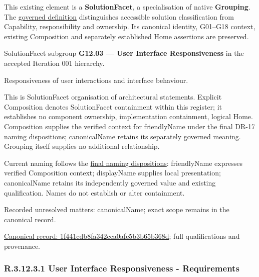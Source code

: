 This existing element is a \textbf{SolutionFacet}, a specialisation of native
\textbf{Grouping}. The \href{\detokenize{../../../../../../../governance/continuum-representation.md#solutionfacet-classification--1119-candidate}}{governed definition}
distinguishes accessible solution classification from Capability, responsibility
and ownership. Its canonical identity, G01–G18 context, existing Composition
and separately established Home assertions are preserved.



SolutionFacet subgroup \textbf{G12.03 — User Interface Responsiveness} in the accepted Iteration 001 hierarchy.



Responsiveness of user interactions and interface behaviour.



This is SolutionFacet organisation of architectural statements. Explicit Composition denotes SolutionFacet containment within this register; it establishes no component ownership, implementation containment, logical Home. Composition supplies the verified context for friendlyName under the final DR-17 naming dispositions; canonicalName retains its separately governed meaning. Grouping itself supplies no additional relationship.



Current naming follows the \href{\detokenize{../../../../../../../governance/canonical-identity-and-naming.md#solutionfacet-naming-roles--dr-17-final-dispositions}}{final naming dispositions}: friendlyName expresses verified Composition context; displayName supplies local presentation; canonicalName retains its independently governed value and existing qualification. Names do not establish or alter containment.


{\small Recorded unresolved matters: canonicalName; exact scope remains in the canonical record.}\par
{\footnotesize \href{../../../../../../../continuum/grouping/1f441cdb8fa342cca0afe5b3b65b368d.md}{Canonical record: 1f441cdb8fa342cca0afe5b3b65b368d}; full qualifications and provenance.}\par
\subsubsection*{R.3.12.3.1 User Interface Responsiveness - Requirements}
\label{navigation:R.3.12.3.1}


